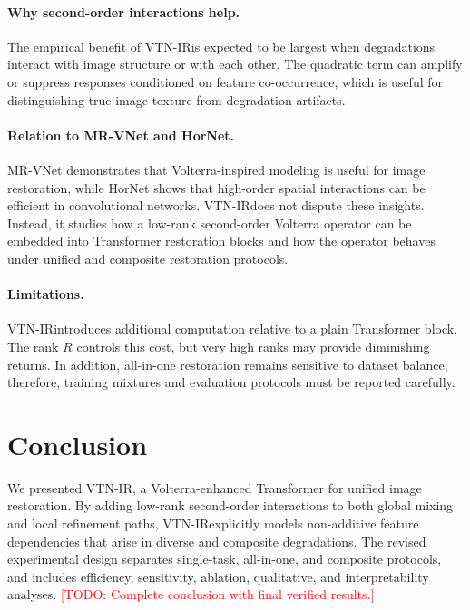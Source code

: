 \documentclass[10pt,twocolumn]{article}
\newcommand{\ours}{VTN-IR}
\newcommand{\todo}[1]{\textcolor{red}{[TODO: #1]}}
\begin{document}
\paragraph{Why second-order interactions help.}
The empirical benefit of \ours is expected to be largest when degradations interact with image structure or with each other. The quadratic term can amplify or suppress responses conditioned on feature co-occurrence, which is useful for distinguishing true image texture from degradation artifacts.

\paragraph{Relation to MR-VNet and HorNet.}
MR-VNet demonstrates that Volterra-inspired modeling is useful for image restoration, while HorNet shows that high-order spatial interactions can be efficient in convolutional networks. \ours does not dispute these insights. Instead, it studies how a low-rank second-order Volterra operator can be embedded into Transformer restoration blocks and how the operator behaves under unified and composite restoration protocols.

\paragraph{Limitations.}
\ours introduces additional computation relative to a plain Transformer block. The rank $R$ controls this cost, but very high ranks may provide diminishing returns. In addition, all-in-one restoration remains sensitive to dataset balance; therefore, training mixtures and evaluation protocols must be reported carefully.

\section{Conclusion}
We presented \ours, a Volterra-enhanced Transformer for unified image restoration. By adding low-rank second-order interactions to both global mixing and local refinement paths, \ours explicitly models non-additive feature dependencies that arise in diverse and composite degradations. The revised experimental design separates single-task, all-in-one, and composite protocols, and includes efficiency, sensitivity, ablation, qualitative, and interpretability analyses. \todo{Complete conclusion with final verified results.}



\end{document}
